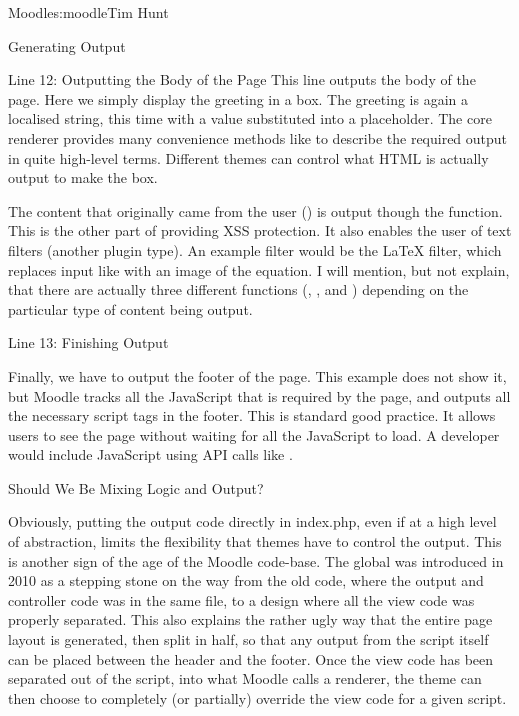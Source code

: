 \begin{aosachapter}{Moodle}{s:moodle}{Tim Hunt}
\begin{aosasect1}{Generating Output}
\begin{aosasect2}{Line 12: Outputting the Body of the Page}
This line outputs the body of the page. Here we simply display the
greeting in a box. The greeting is again a localised string, this time
with a value substituted into a placeholder. The core renderer
 provides many convenience methods like  to
describe the required output in quite high-level terms. Different
themes can control what HTML is actually output to make the box.

The content that originally came from the user () is
output though the  function. This is the other
part of providing XSS protection. It also enables the user of text
filters (another plugin type). An example filter would be the LaTeX
filter, which replaces input like  with an image of
the equation. I will mention, but not explain, that there are actually
three different functions (, , and
) depending on the particular type of content
being output.

\end{aosasect2}

\begin{aosasect2}{Line 13: Finishing Output}

Finally, we have to output the footer of the page. This example does
not show it, but Moodle tracks all the JavaScript that is required by
the page, and outputs all the necessary script tags in the
footer. This is standard good practice. It allows users to see the
page without waiting for all the JavaScript to load. A developer would
include JavaScript using API calls like
.

\begin{aosasect3}{Should We Be Mixing Logic and Output?}

Obviously, putting the output code directly in index.php, even if at a
high level of abstraction, limits the flexibility that themes have to
control the output. This is another sign of the age of the Moodle
code-base. The  global was introduced in 2010 as a
stepping stone on the way from the old code, where the output and
controller code was in the same file, to a design where all the view
code was properly separated. This also explains the rather ugly way
that the entire page layout is generated, then split in half, so that
any output from the script itself can be placed between the header and
the footer. Once the view code has been separated out of the script,
into what Moodle calls a renderer, the theme can then choose to
completely (or partially) override the view code for a given script.


\end{aosasect3}
\end{aosasect2}
\end{aosasect1}
\end{aosachapter}
